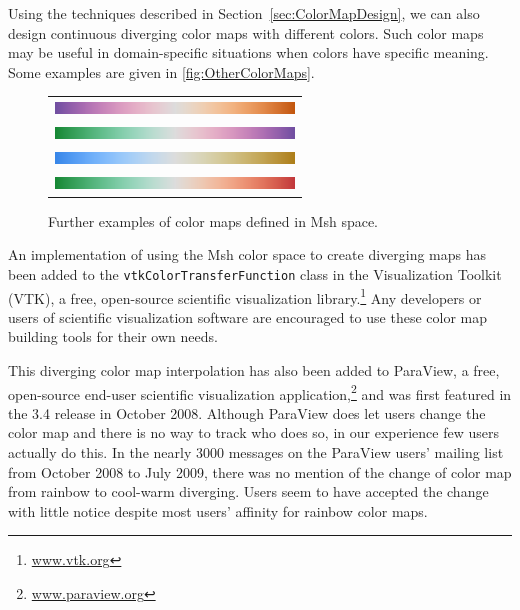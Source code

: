 \documentclass{llncs}
\newcommand{\Msh}{Msh\xspace}
\begin{document}
Using the techniques described in Section~\ref{sec:ColorMapDesign}, we can
also design continuous diverging color maps with different colors.  Such
color maps may be useful in domain-specific situations when colors have
specific meaning.  Some examples are given in
\autoref{fig:OtherColorMaps}.

\begin{figure}
  \centering
  \begin{tabular}{c}
    \includegraphics[width=2.5in]{images/Purple2OrangeBar} \\
    \includegraphics[width=2.5in]{images/Green2PurpleBar} \\
    \includegraphics[width=2.5in]{images/Blue2TanBar} \\
    \includegraphics[width=2.5in]{images/Green2RedDivBar}
  \end{tabular}
  \caption{Further examples of color maps defined in \Msh space.}
  \label{fig:OtherColorMaps}
\end{figure}

  An implementation of using the \Msh color space to create diverging maps
  has been added to the \texttt{vtkColorTransferFunction} class in the
  Visualization Toolkit (VTK), a free, open-source scientific visualization
  library.\footnote{\href{http://www.vtk.org}{www.vtk.org}} Any developers
  or users of scientific visualization software are encouraged to use these
  color map building tools for their own needs.

  This diverging color map interpolation has also been added to ParaView, a
  free, open-source end-user scientific visualization
  application,\footnote{\href{http://www.paraview.org}{www.paraview.org}}
  and was first featured in the 3.4 release in October 2008.  Although
  ParaView does let users change the color map and there is no way to track
  who does so, in our experience few users actually do this.  In the nearly
  3000 messages on the ParaView users' mailing list from October 2008 to
  July 2009, there was no mention of the change of color map from rainbow
  to cool-warm diverging.  Users seem to have accepted the change with
  little notice despite most users' affinity for rainbow color maps.
\end{document}

